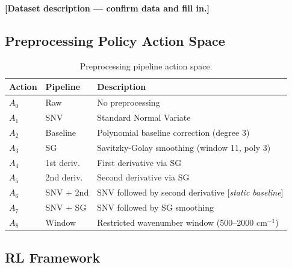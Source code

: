 \documentclass[runningheads]{llncs}
\begin{document}
\textbf{[Dataset description — confirm data and fill in.]}

\subsection{Preprocessing Policy Action Space}


\begin{table}[t]
\caption{Preprocessing pipeline action space.}\label{tab:actions}
\centering
\begin{tabular}{lll}
\toprule
Action & Pipeline & Description \\
\midrule
$A_0$ & Raw & No preprocessing \\
$A_1$ & SNV & Standard Normal Variate \\
$A_2$ & Baseline & Polynomial baseline correction (degree 3) \\
$A_3$ & SG & Savitzky-Golay smoothing (window 11, poly 3) \\
$A_4$ & 1st deriv. & First derivative via SG \\
$A_5$ & 2nd deriv. & Second derivative via SG \\
$A_6$ & SNV + 2nd & SNV followed by second derivative [\emph{static baseline}] \\
$A_7$ & SNV + SG & SNV followed by SG smoothing \\
$A_8$ & Window & Restricted wavenumber window (500--2000 cm$^{-1}$) \\
\bottomrule
\end{tabular}
\end{table}


\subsection{RL Framework}
\end{document}
